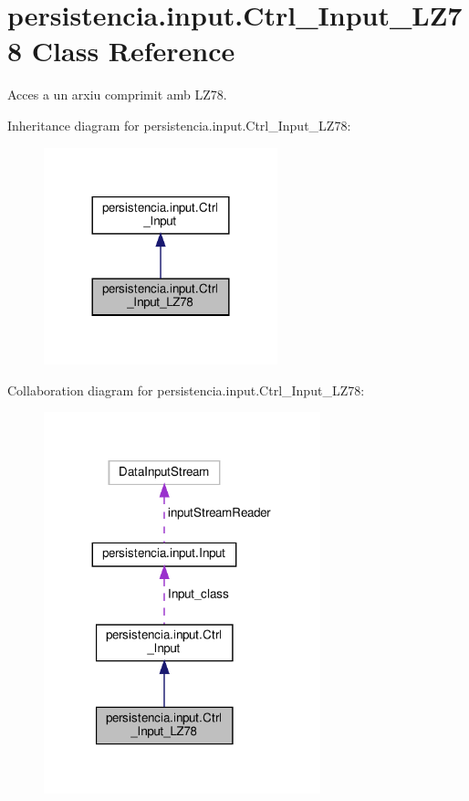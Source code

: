 \hypertarget{classpersistencia_1_1input_1_1Ctrl__Input__LZ78}{}\section{persistencia.\+input.\+Ctrl\+\_\+\+Input\+\_\+\+L\+Z78 Class Reference}
\label{classpersistencia_1_1input_1_1Ctrl__Input__LZ78}


Acces a un arxiu comprimit amb L\+Z78.  




Inheritance diagram for persistencia.\+input.\+Ctrl\+\_\+\+Input\+\_\+\+L\+Z78\+:\nopagebreak
\begin{figure}[H]
\begin{center}
\leavevmode
\includegraphics[width=192pt]{classpersistencia_1_1input_1_1Ctrl__Input__LZ78__inherit__graph}
\end{center}
\end{figure}


Collaboration diagram for persistencia.\+input.\+Ctrl\+\_\+\+Input\+\_\+\+L\+Z78\+:\nopagebreak
\begin{figure}[H]
\begin{center}
\leavevmode
\includegraphics[width=227pt]{classpersistencia_1_1input_1_1Ctrl__Input__LZ78__coll__graph}
\end{center}
\end{figure}
